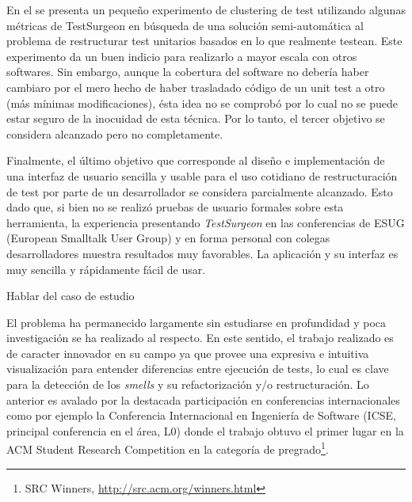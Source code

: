\par En el  se presenta un pequeño experimento de clustering de test utilizando algunas métricas de TestSurgeon en búsqueda de una solución semi-automática al problema de restructurar test unitarios basados en lo que realmente testean. Este experimento da un buen indicio para realizarlo a mayor escala con otros softwares. Sin embargo, aunque la cobertura del software no debería haber cambiaro por el mero hecho de haber trasladado código de un unit test a otro (más mínimas modificaciones), ésta idea no se comprobó por lo cual no se puede estar seguro de la inocuidad de esta técnica. Por lo tanto, el tercer objetivo se considera alcanzado pero no completamente.

\par Finalmente, el último objetivo que corresponde al diseño e implementación de una interfaz de usuario sencilla y usable para el uso cotidiano de restructuración de test por parte de un desarrollador se considera parcialmente alcanzado. Esto dado que, si bien no se realizó pruebas de usuario formales sobre esta herramienta, la experiencia presentando \emph{TestSurgeon} en las conferencias de ESUG (European Smalltalk User Group) y en forma personal con colegas desarrolladores muestra resultados muy favorables. La aplicación y su interfaz es muy sencilla y rápidamente fácil de usar.

\par Hablar del caso de estudio

\par El problema ha permanecido largamente sin estudiarse en profundidad y poca investigación se ha realizado al respecto. En este sentido, el trabajo realizado es de caracter innovador en su campo ya que provee una expresiva e intuitiva visualización para entender diferencias entre ejecución de tests, lo cual es clave para la detección de los \emph{smells} y su refactorización y/o restructuración. Lo anterior es avalado por la destacada participación en conferencias internacionales como por ejemplo la Conferencia Internacional en Ingeniería de Software (ICSE, principal conferencia en el área, L0) donde el trabajo obtuvo el primer lugar en la ACM Student Research Competition en la categoría de pregrado\footnote{SRC Winners, \url{http://src.acm.org/winners.html}}.  


